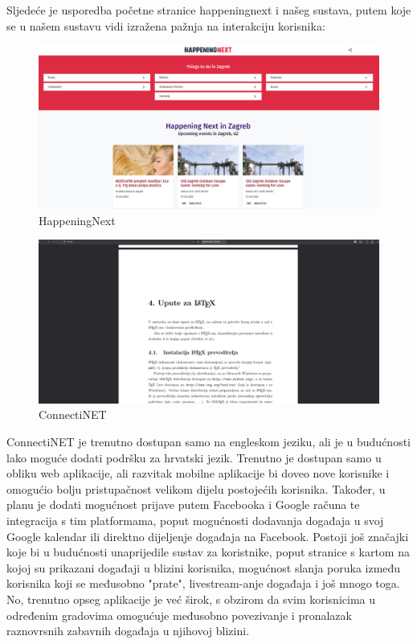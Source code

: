 		Sljedeće je usporedba početne stranice happeningnext i našeg sustava, putem koje se u našem sustavu vidi izražena pažnja na interakciju korisnika:
		
		\begin{figure}[H]
		 	\includegraphics[scale=0.25]{slike/HappeningNext.png} 
		 	\centering
		 	\caption{HappeningNext}
		 	\label{fig:HappeningNext}
		 \end{figure}
		
		 \begin{figure}[H]
		 	\includegraphics[scale=0.25]{slike/ConnectiNET.png} 
		 	\centering
		 	\caption{ConnectiNET}
		 	\label{fig:ConnectiNET}
		 \end{figure}

		ConnectiNET je trenutno dostupan samo na engleskom jeziku, ali je u budućnosti lako moguće dodati podršku za hrvatski jezik. Trenutno je dostupan samo u obliku web aplikacije, ali razvitak mobilne aplikacije bi doveo nove korisnike i omogućio bolju pristupačnost velikom dijelu postojećih korisnika. Također, u planu je dodati mogućnost prijave putem Facebooka i Google računa te integracija s tim platformama, poput mogućnosti dodavanja događaja u svoj Google kalendar ili direktno dijeljenje događaja na Facebook. Postoji još značajki koje bi u budućnosti unaprijedile sustav za koristnike, poput stranice s kartom na kojoj su prikazani događaji u blizini korisnika, mogućnost slanja poruka između korisnika koji se međusobno "prate", livestream-anje događaja i još mnogo toga. No, trenutno opseg aplikacije je već širok, s obzirom da svim korisnicima u određenim gradovima omogućuje međusobno povezivanje i pronalazak raznovrsnih zabavnih događaja u njihovoj blizini.

